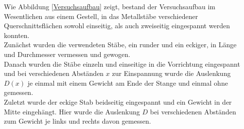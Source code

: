 Wie Abbildung \ref{Versuchsaufbau} zeigt, bestand der Versuchsaufbau im Wesentlichen aus einem Gestell, in das Metallstäbe verschiedener Querschnittsflächen sowohl einseitig, als auch zweiseitig eingespannt werden konnten. \\
%
\label{Versuchsaufbau}
Zunächst wurden die verwendeten Stäbe, ein runder und ein eckiger, in Länge und Durchmesser vermessen und gewogen. \\
Danach wurden die Stäbe einzeln und einseitige in die Vorrichtung eingespannt und bei verschiedenen Abständen $x$ zur Einspannung wurde die Auslenkung $D(x)$ je einmal mit einem Gewicht am Ende der Stange und einmal ohne gemessen. \\
Zuletzt wurde der eckige Stab beidseitig eingespannt und ein Gewicht in der Mitte eingehängt. Hier wurde die Auslenkung $D$ bei verschiedenen Abständen zum Gewicht je links und rechts davon gemessen.